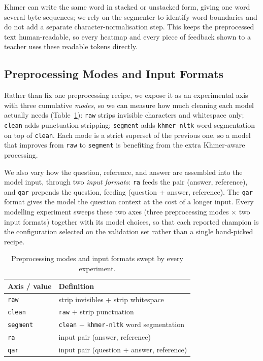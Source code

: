 Khmer can write the same word in stacked or unstacked form, giving one word several byte sequences; we
rely on the segmenter to identify word boundaries and do not add a separate character-normalisation
step. This keeps the preprocessed text human-readable, so every heatmap and every piece of feedback
shown to a teacher uses these readable tokens directly.

\subsection{Preprocessing Modes and Input Formats}
\label{sec:axes}
Rather than fix one preprocessing recipe, we expose it as an experimental axis with three cumulative
\emph{modes}, so we can measure how much cleaning each model actually needs (Table~\ref{tab:axes}):
\texttt{raw} strips invisible characters and whitespace only; \texttt{clean} adds
punctuation stripping; \texttt{segment} adds \texttt{khmer-nltk} word segmentation on top of
\texttt{clean}. Each mode is a strict superset of the previous one, so a model that improves from
\texttt{raw} to \texttt{segment} is benefiting from the extra Khmer-aware processing.

We also vary how the question, reference, and answer are assembled into the model input, through two
\emph{input formats}: \texttt{ra} feeds the pair (answer, reference), and \texttt{qar} prepends the
question, feeding (question + answer, reference). The \texttt{qar} format gives the model the question
context at the cost of a longer input. Every modelling experiment sweeps these two axes (three
preprocessing modes $\times$ two input formats) together with its model choices, so that each reported
champion is the configuration selected on the validation set rather than a single hand-picked recipe.

\begin{table}[t]
\centering
\caption{Preprocessing modes and input formats swept by every experiment.}
\label{tab:axes}
\small
\begin{tabular}{@{}ll@{}}
\toprule
Axis / value & Definition \\
\midrule
\texttt{raw}     & strip invisibles + strip whitespace \\
\texttt{clean}   & \texttt{raw} + strip punctuation \\
\texttt{segment} & \texttt{clean} + \texttt{khmer-nltk} word segmentation \\
\midrule
\texttt{ra}  & input pair (answer, reference) \\
\texttt{qar} & input pair (question + answer, reference) \\
\bottomrule
\end{tabular}
\end{table}

